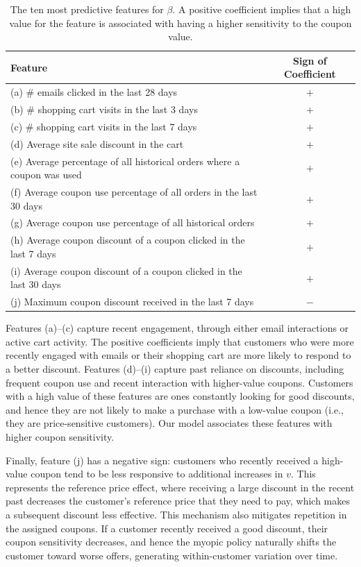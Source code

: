 \documentclass[format=acmsmall, review=false]{acmart}
\begin{document}
\begin{table}
\begin{center}
\begin{tabular}{@{}lc@{}}
\toprule
\; Feature & Sign of Coefficient  \\ \midrule
\; (a) \# emails clicked in the last 28 days & $+$ \\ 
\; (b) \# shopping cart visits in the last 3 days   & $+$ \\
\; (c) \# shopping cart visits in the last 7 days   & $+$ \\
\; (d) Average site sale discount in the cart & $+$ \\
\; (e) Average percentage of all historical orders where a coupon was used & $+$ \\
\; (f) Average coupon use percentage of all orders in the last 30 days & $+$ \\
\; (g) Average coupon use percentage of all historical orders & $+$ \\
\; (h) Average coupon discount of a coupon clicked in the last 7 days   & $+$ \\
\; (i) Average coupon discount of a coupon clicked in the last 30 days   & $+$ \\
\; (j) Maximum coupon discount received in the last 7 days & $-$ \\
\bottomrule
\end{tabular}
\end{center}
\caption{
The ten most predictive features for $\beta$.
A positive coefficient implies that a high value for the feature is associated with having a higher sensitivity to the coupon value. 
} \label{tab:beta_coefs}
\end{table}

Features (a)–(c) capture recent engagement, through either email interactions or active cart activity.
The positive coefficients imply that customers who were more recently engaged with emails or their shopping cart are more likely to respond to a better discount. 
Features (d)–(i) capture past reliance on discounts, including frequent coupon use and recent interaction with higher-value coupons. Customers with a high value of these features are ones constantly looking for good discounts, and hence they are not likely to make a purchase with a low-value coupon (i.e., they are price-sensitive customers). Our model associates these features with higher coupon sensitivity.

Finally, feature (j) has a negative sign: customers who recently received a high-value coupon tend to be less responsive to additional increases in $v$. This represents the reference price effect, where receiving a large discount in the recent past decreases the customer's reference price that they need to pay, which makes a subsequent discount less effective.
This mechanism also mitigates repetition in the assigned coupons. If a customer recently received a good discount, their coupon sensitivity decreases, and hence the myopic policy naturally shifts the customer toward worse offers, generating within-customer variation over time.
\end{document}
